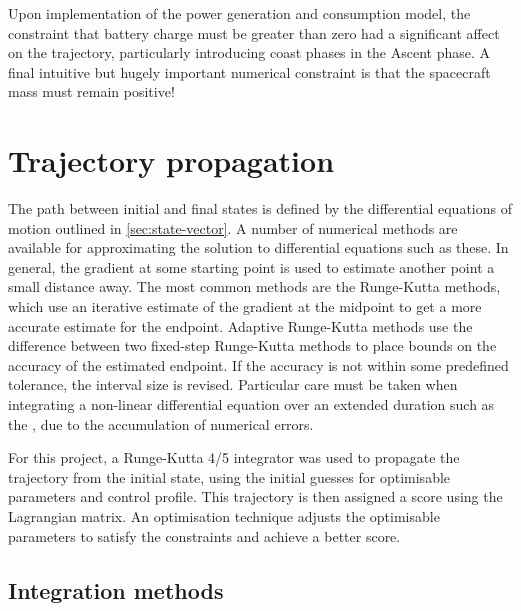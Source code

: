 Upon implementation of the power generation and consumption model, the constraint that battery charge must be greater than zero had a significant affect on the trajectory, particularly introducing coast phases in the Ascent phase. A final intuitive but hugely important numerical constraint is that the spacecraft mass must remain positive! 


\section{Trajectory propagation} \label{sec:Propagation}
The path between initial and final states is defined by the differential equations of motion outlined in \autoref{sec:state-vector}. A number of numerical methods are available for approximating the solution to differential equations such as these. In general, the gradient at some starting point is used to estimate another point a small distance away. The most common methods are the Runge-Kutta methods, which use an iterative estimate of the gradient at the midpoint to get a more accurate estimate for the endpoint. Adaptive Runge-Kutta methods use the difference between two fixed-step Runge-Kutta methods to place bounds on the accuracy of the estimated endpoint. If the accuracy is not within some predefined tolerance, the interval size is revised. Particular care must be taken when integrating a non-linear differential equation over an extended duration such as the \BW, due to the accumulation of numerical errors.

For this project, a Runge-Kutta 4/5 integrator was used to propagate the trajectory from the initial state, using the initial guesses for optimisable parameters and control profile. This trajectory is then assigned a score using the Lagrangian matrix. An optimisation technique adjusts the optimisable parameters to satisfy the constraints and achieve a better score. %



\subsection{Integration methods} \label{sub:Integration}

